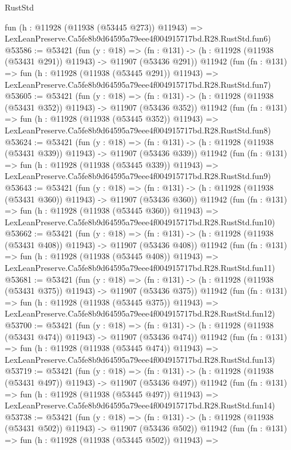 \begin{lexlean}{RustStd}
\begin{coremodule}
    fun (h : @11928 (@11938 (@53445 @273)) @11943) =>
    LexLeanPreserve.Ca5fe8b9d64595a79eee4f004915717bd.R28.RustStd.fun6)
@53586 := @53421
    (fun (y : @18) =>
    (fn : @131) -> (h : @11928 (@11938 (@53431 @291)) @11943) -> @11907 (@53436 @291))
    @11942
    (fun (fn : @131) =>
    fun (h : @11928 (@11938 (@53445 @291)) @11943) =>
    LexLeanPreserve.Ca5fe8b9d64595a79eee4f004915717bd.R28.RustStd.fun7)
@53605 := @53421
    (fun (y : @18) =>
    (fn : @131) -> (h : @11928 (@11938 (@53431 @352)) @11943) -> @11907 (@53436 @352))
    @11942
    (fun (fn : @131) =>
    fun (h : @11928 (@11938 (@53445 @352)) @11943) =>
    LexLeanPreserve.Ca5fe8b9d64595a79eee4f004915717bd.R28.RustStd.fun8)
@53624 := @53421
    (fun (y : @18) =>
    (fn : @131) -> (h : @11928 (@11938 (@53431 @339)) @11943) -> @11907 (@53436 @339))
    @11942
    (fun (fn : @131) =>
    fun (h : @11928 (@11938 (@53445 @339)) @11943) =>
    LexLeanPreserve.Ca5fe8b9d64595a79eee4f004915717bd.R28.RustStd.fun9)
@53643 := @53421
    (fun (y : @18) =>
    (fn : @131) -> (h : @11928 (@11938 (@53431 @360)) @11943) -> @11907 (@53436 @360))
    @11942
    (fun (fn : @131) =>
    fun (h : @11928 (@11938 (@53445 @360)) @11943) =>
    LexLeanPreserve.Ca5fe8b9d64595a79eee4f004915717bd.R28.RustStd.fun10)
@53662 := @53421
    (fun (y : @18) =>
    (fn : @131) -> (h : @11928 (@11938 (@53431 @408)) @11943) -> @11907 (@53436 @408))
    @11942
    (fun (fn : @131) =>
    fun (h : @11928 (@11938 (@53445 @408)) @11943) =>
    LexLeanPreserve.Ca5fe8b9d64595a79eee4f004915717bd.R28.RustStd.fun11)
@53681 := @53421
    (fun (y : @18) =>
    (fn : @131) -> (h : @11928 (@11938 (@53431 @375)) @11943) -> @11907 (@53436 @375))
    @11942
    (fun (fn : @131) =>
    fun (h : @11928 (@11938 (@53445 @375)) @11943) =>
    LexLeanPreserve.Ca5fe8b9d64595a79eee4f004915717bd.R28.RustStd.fun12)
@53700 := @53421
    (fun (y : @18) =>
    (fn : @131) -> (h : @11928 (@11938 (@53431 @474)) @11943) -> @11907 (@53436 @474))
    @11942
    (fun (fn : @131) =>
    fun (h : @11928 (@11938 (@53445 @474)) @11943) =>
    LexLeanPreserve.Ca5fe8b9d64595a79eee4f004915717bd.R28.RustStd.fun13)
@53719 := @53421
    (fun (y : @18) =>
    (fn : @131) -> (h : @11928 (@11938 (@53431 @497)) @11943) -> @11907 (@53436 @497))
    @11942
    (fun (fn : @131) =>
    fun (h : @11928 (@11938 (@53445 @497)) @11943) =>
    LexLeanPreserve.Ca5fe8b9d64595a79eee4f004915717bd.R28.RustStd.fun14)
@53738 := @53421
    (fun (y : @18) =>
    (fn : @131) -> (h : @11928 (@11938 (@53431 @502)) @11943) -> @11907 (@53436 @502))
    @11942
    (fun (fn : @131) =>
    fun (h : @11928 (@11938 (@53445 @502)) @11943) =>

\end{coremodule}
\end{lexlean}

